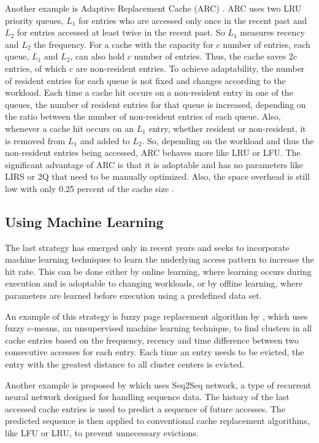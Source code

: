 \documentclass[
	12pt,
	a4paper,
	abstract,
	bibliography=totoc,
	chapterprefix,
	headings=openright,
	numbers=endperiod,
	parskip=half,
	twoside,
]{scrreprt}
\begin{document}
Another example is Adaptive Replacement Cache (ARC) \cite{270366}.
ARC uses two LRU priority queues, $L_1$ for entries who are accessed only once in the recent past and 
$L_2$ for entries accessed at least twice in the recent past.
So $L_1$ measures recency and $L_2$ the frequency.
For a cache with the capacity for $c$ number of entries, each queue, $L_1$ and $L_2$, can also hold $c$ number of entries.
Thus, the cache saves $2c$ entries, of which $c$ are non-resident entries.
To achieve adaptability, the number of resident entries for each queue is not fixed and changes according to the workload.
Each time a cache hit occurs on a non-resident entry in one of the queues, the number of resident entries for that queue is increased,
depending on the ratio between the number of non-resident entries of each queue.
Also, whenever a cache hit occurs on an $L_1$ entry, whether resident or non-resident, it is removed from $L_1$ and added to $L_2$.
So, depending on the workload and thus the non-resident entries being accessed, ARC behaves more like LRU or LFU.
The significant advantage of ARC is that it is adoptable and has no parameters like LIRS or 2Q that need to be manually optimized.
Also, the space overhead is still low with only 0.25 percent of the cache size \cite{megiddo2004outperforming}.

\subsection{Using Machine Learning}

The last strategy has emerged only in recent years and seeks to incorporate machine learning techniques to learn 
the underlying access pattern to increase the hit rate.
This can be done either by online learning, where learning occurs during execution and is adoptable to changing workloads, 
or by offline learning, where parameters are learned before execution using a predefined data set.

An example of this strategy is fuzzy page replacement algorithm by \cite{akbari2020page}, which uses
fuzzy c-means, an unsupervised machine learning technique, to find clusters in all cache entries based 
on the frequency, recency and 
time difference between two consecutive accesses for each entry.
Each time an entry needs to be evicted, the entry with the greatest distance to all cluster centers is evicted.

Another example is proposed by \cite{choi2022learning} which uses Seq2Seq network, 
a type of recurrent neural network designed for handling sequence data.
The history of the last accessed cache entries is used to predict a sequence of future accesses.
The predicted sequence is then applied to conventional cache replacement algorithms, 
like LFU or LRU, to prevent unnecessary evictions. 
\end{document}
